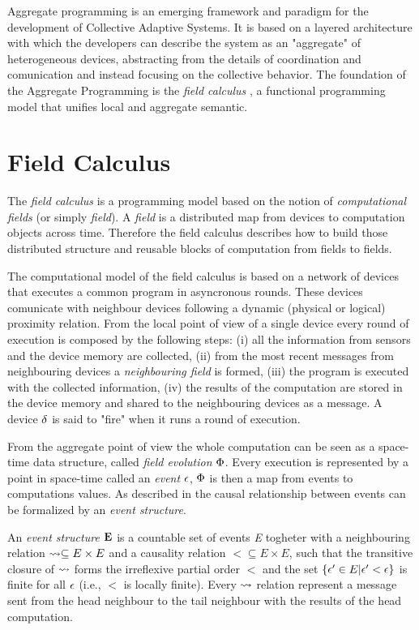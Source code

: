 Aggregate programming \cite{Aggregate01} is an emerging framework and paradigm for the development of Collective Adaptive Systems. It is based on a layered architecture with which the developers can describe the system as an "aggregate" of heterogeneous devices, abstracting from the details of coordination and comunication and instead focusing on the collective behavior. The foundation of the Aggregate Programming is the \textit{field calculus} \cite{FieldCalculus}, a functional programming model that unifies local and aggregate semantic.

\section{Field Calculus}

The \textit{field calculus} is a programming model based on the notion of \textit{computational fields} \cite{Field} (or simply \textit{field}). A \textit{field} is a distributed map from devices to computation objects across time. Therefore the field calculus describes how to build those distributed structure and reusable blocks of computation from fields to fields.

The computational model of the field calculus is based on a network of devices that executes a common program in asyncronous rounds. These devices comunicate with neighbour devices following a dynamic (physical or logical) proximity relation. From the local point of view of a single device every round of execution is composed by the following steps: (i) all the information from sensors and the device memory are collected, (ii) from the most recent messages from neighbouring devices a \textit{neighbouring field} is formed, (iii) the program is executed with the collected information, (iv) the results of the computation are stored in the device memory and shared to the neighbouring devices as a message. A device $\delta$ is said to "fire" when it runs a round of execution.

From the aggregate point of view the whole computation can be seen as  a space-time data structure, called \textit{field evolution} $\Phi$.  Every execution is represented by a point in space-time called an \textit{event} $\epsilon$, $\Phi$ is then a map from events to computations values. As described in \cite{Universality} the causal relationship between events can be formalized by an \textit{event structure}.

An \textit{event structure} $\mathbf{E}$ is a countable set of events \textit{E} togheter with a neighbouring relation $\rightsquigarrow \subseteq E \times E $ and a causality relation $< \subseteq E \times E$, such that the transitive closure of $\rightsquigarrow$ forms the irreflexive partial order $<$ and the set $\left\lbrace \epsilon' \in E | \epsilon' < \epsilon  \right\rbrace$ is finite for all $\epsilon$ (i.e., $<$ is locally finite). Every $\rightsquigarrow$ relation represent a message sent from the head neighbour to the tail neighbour with the results of the head computation.

